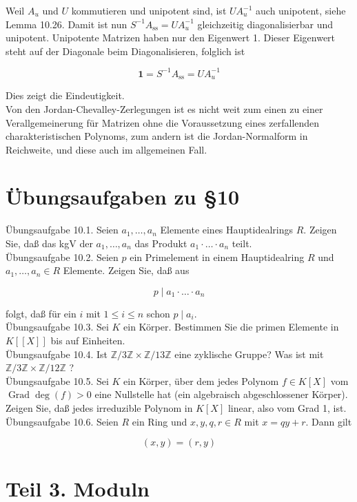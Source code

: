 \documentclass[10pt, letterpaper]{article}
\begin{document}
Weil $A_{u}$ und $U$ kommutieren und unipotent sind, ist $U A_{u}^{-1}$ auch unipotent, siehe Lemma 10.26. Damit ist nun $S^{-1} A_{\mathrm{ss}}=U A_{u}^{-1}$ gleichzeitig diagonalisierbar und unipotent. Unipotente Matrizen haben nur den Eigenwert 1. Dieser Eigenwert steht auf der Diagonale beim Diagonalisieren, folglich ist

$$
\mathbf{1}=S^{-1} A_{\mathrm{ss}}=U A_{u}^{-1}
$$

Dies zeigt die Eindeutigkeit.\\
Von den Jordan-Chevalley-Zerlegungen ist es nicht weit zum einen zu einer Verallgemeinerung für Matrizen ohne die Voraussetzung eines zerfallenden charakteristischen Polynoms, zum andern ist die Jordan-Normalform in Reichweite, und diese auch im allgemeinen Fall.

\section*{Übungsaufgaben zu §10}
Übungsaufgabe 10.1. Seien $a_{1}, \ldots, a_{n}$ Elemente eines Hauptidealrings $R$. Zeigen Sie, daß das kgV der $a_{1}, \ldots, a_{n}$ das Produkt $a_{1} \cdot \ldots \cdot a_{n}$ teilt.\\
Übungsaufgabe 10.2. Seien $p$ ein Primelement in einem Hauptidealring $R$ und $a_{1}, \ldots, a_{n} \in R$ Elemente. Zeigen Sie, daß aus

$$
p \mid a_{1} \cdot \ldots \cdot a_{n}
$$

folgt, daß für ein $i$ mit $1 \leq i \leq n$ schon $p \mid a_{i}$.\\
Übungsaufgabe 10.3. Sei $K$ ein Körper. Bestimmen Sie die primen Elemente in $K[[X]]$ bis auf Einheiten.\\
Übungsaufgabe 10.4. Ist $\mathbb{Z} / 3 \mathbb{Z} \times \mathbb{Z} / 13 \mathbb{Z}$ eine zyklische Gruppe? Was ist mit $\mathbb{Z} / 3 \mathbb{Z} \times \mathbb{Z} / 12 \mathbb{Z}$ ?\\
Übungsaufgabe 10.5. Sei $K$ ein Körper, über dem jedes Polynom $f \in K[X]$ vom $\operatorname{Grad} \operatorname{deg}(f)>0$ eine Nullstelle hat (ein algebraisch abgeschlossener Körper). Zeigen Sie, daß jedes irreduzible Polynom in $K[X]$ linear, also vom Grad 1, ist.\\
Übungsaufgabe 10.6. Seien $R$ ein Ring und $x, y, q, r \in R$ mit $x=q y+r$. Dann gilt

$$
(x, y)=(r, y)
$$

\section*{Teil 3. Moduln}
\end{document}
